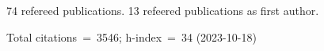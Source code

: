 74 refereed publications. 13 refeered publications as first author.

Total citations~=~3546; h-index~=~34 (2023-10-18)